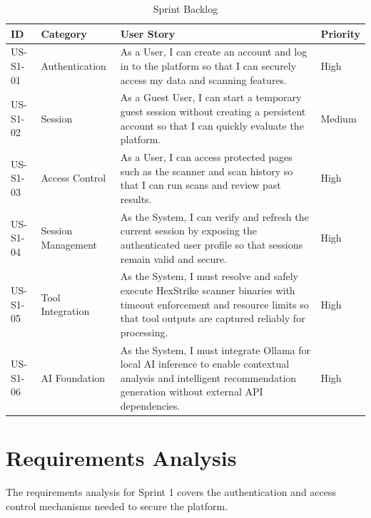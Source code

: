 \begin{table}[H]
    \centering
    \caption{Sprint Backlog}
    \label{tab:sprint-backlog-s1}
    \renewcommand{\arraystretch}{1.35}
    \small
    \setlength{\tabcolsep}{8pt}
    \begin{tabularx}{\textwidth}{|>{\centering\arraybackslash}p{1.6cm}|>{\centering\arraybackslash}p{2.2cm}|>{\raggedright\arraybackslash}X|>{\centering\arraybackslash}p{1.2cm}|}
        \hline
        \textbf{ID} & \textbf{Category} & \textbf{User Story} & \textbf{Priority} \\
        \hline
        US-S1-01 & Authentication & As a User, I can create an account and log in to the platform so that I can securely access my data and scanning features. & High \\
        \hline
        US-S1-02 & Session & As a Guest User, I can start a temporary guest session without creating a persistent account so that I can quickly evaluate the platform. & Medium \\
        \hline
        US-S1-03 & Access Control & As a User, I can access protected pages such as the scanner and scan history so that I can run scans and review past results. & High \\
        \hline
        US-S1-04 & Session Management & As the System, I can verify and refresh the current session by exposing the authenticated user profile so that sessions remain valid and secure. & High \\
        \hline
        US-S1-05 & Tool Integration & As the System, I must resolve and safely execute HexStrike scanner binaries with timeout enforcement and resource limits so that tool outputs are captured reliably for processing. & High \\
        \hline
        US-S1-06 & AI Foundation & As the System, I must integrate Ollama for local AI inference to enable contextual analysis and intelligent recommendation generation without external API dependencies. & High \\
        \hline
    \end{tabularx}
\end{table}

\section{Requirements Analysis}

\indent\justifying The requirements analysis for Sprint 1 covers the authentication and access control mechanisms needed to secure the platform.

